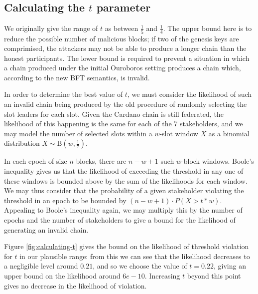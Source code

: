 \documentclass[11pt,a4paper]{article}
\begin{document}
\begin{appendices}
  \section{Calculating the $t$ parameter}
  \label{apdx:calculating-t}

  We originally give the range of $t$ as between $\frac{1}{5}$ and $\frac{1}{4}$.
  The upper bound here is to reduce the possible number of malicious blocks; if
  two of the genesis keys are comprimised, the attackers may not be able to
  produce a longer chain than the honest participants. The lower bound is required
  to prevent a situation in which a chain produced under the initial Ouroboros
  setting produces a chain which, according to the new BFT semantics, is invalid.

  In order to determine the best value of $t$, we must consider the likelihood of
  such an invalid chain being produced by the old procedure of randomly selecting
  the slot leaders for each slot. Given the Cardano chain is still federated, the
  likelihood of this happening is the same for each of the 7 stakeholders, and we
  may model the number of selected slots within a $w$-slot window $X$ as a binomial
  distribution $X \sim \mathrm{B}\left(w, \frac{1}{7}\right)$.

  In each epoch of size $n$ blocks, there are $n-w+1$ such $w$-block windows.
  Boole's inequality gives us that the likelihood of exceeding the threshold in
  any one of these windows is bounded above by the sum of the likelihoods for each
  window. We may thus consider that the probability of a given stakeholder
  violating the threshold in an epoch to be bounded by $(n-w+1)\cdot P(X > t*w)$.
  Appealing to Boole's inequality again, we may multiply this by the number of
  epochs and the number of stakeholders to give a bound for the likelihood of
  generating an invalid chain.

  Figure \ref{fig:calculating-t} gives the bound on the likelihood of threshold
  violation for $t$ in our plausible range: from this we can see that the
  likelihood decreases to a negligible level around $0.21$, and so we choose the
  value of $t=0.22$, giving an upper bound on the likelihood around $6e-10$.
  Increasing $t$ beyond this point gives no decrease in the likelihood of
  violation.


\end{appendices}
\end{document}
